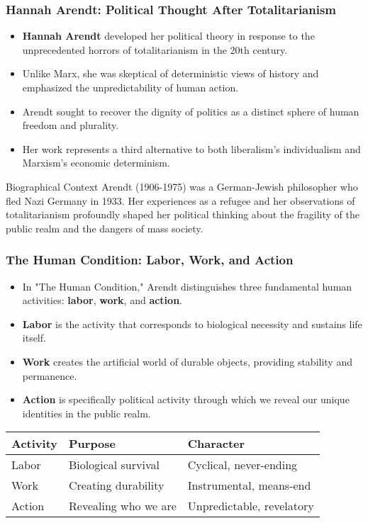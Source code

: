 \documentclass{beamer}
\begin{document}
\begin{frame}
\frametitle{Hannah Arendt: Political Thought After Totalitarianism}
\begin{itemize}
    \item \textbf{Hannah Arendt} developed her political theory in response to the unprecedented horrors of totalitarianism in the 20th century.
    \item Unlike Marx, she was skeptical of deterministic views of history and emphasized the unpredictability of human action.
    \item Arendt sought to recover the dignity of politics as a distinct sphere of human freedom and plurality.
    \item Her work represents a third alternative to both liberalism's individualism and Marxism's economic determinism.
\end{itemize}

\begin{exampleblock}{Biographical Context}
Arendt (1906-1975) was a German-Jewish philosopher who fled Nazi Germany in 1933. Her experiences as a refugee and her observations of totalitarianism profoundly shaped her political thinking about the fragility of the public realm and the dangers of mass society.
\end{exampleblock}
\end{frame}

\begin{frame}
\frametitle{The Human Condition: Labor, Work, and Action}
\begin{itemize}
    \item In "The Human Condition," Arendt distinguishes three fundamental human activities: \textbf{labor}, \textbf{work}, and \textbf{action}.
    \item \textbf{Labor} is the activity that corresponds to biological necessity and sustains life itself.
    \item \textbf{Work} creates the artificial world of durable objects, providing stability and permanence.
    \item \textbf{Action} is specifically political activity through which we reveal our unique identities in the public realm.
\end{itemize}

\begin{center}
\begin{tabular}{lll}
\toprule
\textbf{Activity} & \textbf{Purpose} & \textbf{Character} \\
\midrule
Labor & Biological survival & Cyclical, never-ending \\
Work & Creating durability & Instrumental, means-end \\
Action & Revealing who we are & Unpredictable, revelatory \\
\bottomrule
\end{tabular}
\end{center}
\end{frame}
\end{document}
